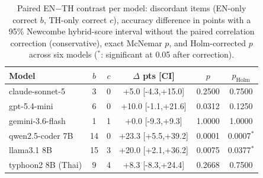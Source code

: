 \begin{table}[t]
\caption{Paired EN$-$TH contrast per model: discordant items (EN-only
correct $b$, TH-only correct $c$), accuracy difference in points with a
95\% Newcombe hybrid-score interval without the paired correlation correction (conservative), exact McNemar $p$, and Holm-corrected $p$ across six
models ($^{*}$: significant at 0.05 after correction).}
\label{tab:crosslingual}
\centering\footnotesize\setlength{\tabcolsep}{3.5pt}
\begin{tabular}{lccccc}
\toprule
Model & $b$ & $c$ & $\Delta$ pts [CI] & $p$ & $p_{\text{Holm}}$ \\
\midrule
claude-sonnet-5 & 3 & 0 & +5.0 [-4.3,+15.0] & 0.2500 & 0.7500 \\
gpt-5.4-mini & 6 & 0 & +10.0 [-1.1,+21.6] & 0.0312 & 0.1250 \\
gemini-3.6-flash & 1 & 1 & +0.0 [-9.3,+9.3] & 1.0000 & 1.0000 \\
qwen2.5-coder 7B & 14 & 0 & +23.3 [+5.5,+39.2] & 0.0001 & 0.0007$^{*}$ \\
llama3.1 8B & 15 & 3 & +20.0 [+2.1,+36.2] & 0.0075 & 0.0377$^{*}$ \\
typhoon2 8B (Thai) & 9 & 4 & +8.3 [-8.3,+24.4] & 0.2668 & 0.7500 \\
\bottomrule
\end{tabular}
\end{table}
